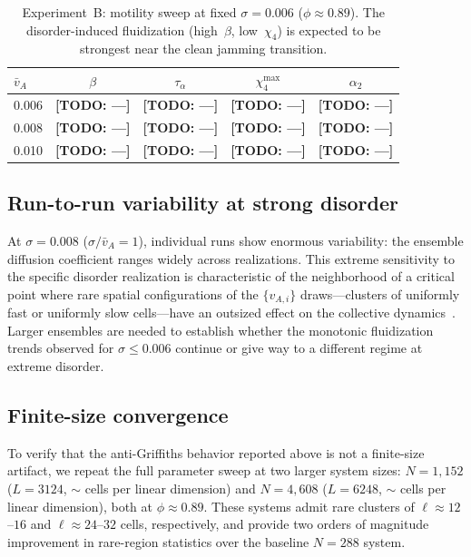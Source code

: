 \documentclass[aps,pre,twocolumn,superscriptaddress,longbibliography,floatfix]{revtex4-2}
\newcommand{\TODO}[1]{{\color{red}\textbf{[TODO: #1]}}}
\begin{document}
\begin{table}[b]
\caption{Experiment~B: motility sweep at fixed $\sigma\!=\!0.006$
  ($\phi\!\approx\!0.89$).
  The disorder-induced fluidization (high~$\beta$, low~$\chi_4$) is
  expected to be strongest near the clean jamming
  transition.}
\label{tab:motility-sweep}
\begin{ruledtabular}
\begin{tabular}{lcccc}
$\bar{v}_A$ & $\beta$ & $\tau_\alpha$ & $\chi_4^{\max}$ & $\alpha_2$ \\
\midrule
0.006 & \TODO{---} & \TODO{---} & \TODO{---} & \TODO{---} \\
0.008 & \TODO{---} & \TODO{---} & \TODO{---} & \TODO{---} \\
0.010 & \TODO{---} & \TODO{---} & \TODO{---} & \TODO{---} \\
\end{tabular}
\end{ruledtabular}
\end{table}

\subsection{Run-to-run variability at strong disorder}
\label{sec:variability}

At $\sigma\!=\!0.008$ ($\sigma/\bar{v}_A\!=\!1$), individual runs show
enormous variability: the ensemble diffusion coefficient ranges
widely across realizations.  This extreme sensitivity to the
specific disorder realization is characteristic of the neighborhood
of a critical point where rare spatial configurations of the
$\{v_{A,i}\}$ draws---clusters of uniformly fast or uniformly slow
cells---have an outsized effect on the collective
dynamics~\cite{vojta2006}.  Larger
ensembles are needed to establish whether the monotonic fluidization
trends observed for $\sigma\!\le\!0.006$ continue or give way to a
different regime at extreme disorder.

\subsection{Finite-size convergence}
\label{sec:finite-size}

To verify that the anti-Griffiths behavior reported above is not a
finite-size artifact, we repeat the full parameter sweep at two larger
system sizes: $N\!=\!1{,}152$ ($L\!=\!3124$, $\sim$ cells per
linear dimension) and $N\!=\!4{,}608$ ($L\!=\!6248$, $\sim$ cells
per linear dimension), both at $\phi\!\approx\!0.89$.  These systems
admit rare clusters of $\ell\!\approx\!12$--$16$ and
$\ell\!\approx\!24$--$32$ cells, respectively, and provide two orders
of magnitude improvement in rare-region statistics over the baseline
$N\!=\!288$ system.
\end{document}
